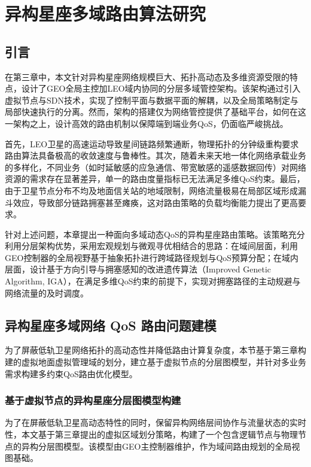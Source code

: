 \documentclass[print, master, vlined]{DissertUESTC}
\begin{document}
    \chapter{异构星座多域路由算法研究}
    \section{引言}
    在第三章中，本文针对异构星座网络规模巨大、拓扑高动态及多维资源受限的特点，设计了GEO全局主控加LEO域内协同的分层多域管控架构。该架构通过引入虚拟节点与SDN技术，实现了控制平面与数据平面的解耦，以及全局策略制定与局部快速执行的分离。然而，架构的搭建仅为网络管控提供了基础平台，如何在这一架构之上，设计高效的路由机制以保障端到端业务QoS，仍面临严峻挑战。
    
    首先，LEO卫星的高速运动导致星间链路频繁通断，物理拓扑的分钟级重构要求路由算法具备极高的收敛速度与鲁棒性。其次，随着未来天地一体化网络承载业务的多样化，不同业务（如时延敏感的应急通信、带宽敏感的遥感数据回传）对网络资源的需求存在显著差异，单一的路由度量指标已无法满足多维QoS约束。最后，由于卫星节点分布不均及地面信关站的地域限制，网络流量极易在局部区域形成漏斗效应，导致部分链路拥塞甚至瘫痪，这对路由策略的负载均衡能力提出了更高要求。

    针对上述问题，本章提出一种面向多域动态QoS的异构星座路由策略。该策略充分利用分层架构优势，采用宏观规划与微观寻优相结合的思路：在域间层面，利用GEO控制器的全局视野基于抽象拓扑进行跨域路径规划与QoS预算分配；在域内层面，设计基于方向引导与拥塞感知的改进遗传算法（Improved Genetic Algorithm, IGA），在满足多维QoS约束的前提下，实现对拥塞路径的主动规避与网络流量的及时调度。

    \section{异构星座多域网络 QoS 路由问题建模}
    为了屏蔽低轨卫星网络拓扑的高动态性并降低路由计算复杂度，本节基于第三章构建的虚拟地面虚拟管理域的划分，建立基于虚拟节点的分层图模型，并针对多业务需求构建多约束QoS路由优化模型。
    \subsection{基于虚拟节点的异构星座分层图模型构建}
    \label{sec: 异构星座分层图模型}
    为了在屏蔽低轨卫星高动态特性的同时，保留异构网络层间协作与流量状态的实时性，本文基于第三章提出的虚拟区域划分策略，构建了一个包含逻辑节点与物理节点的异构分层图模型。该模型由GEO主控制器维护，作为域间路由规划的全局视图基础。
    
\end{document}
